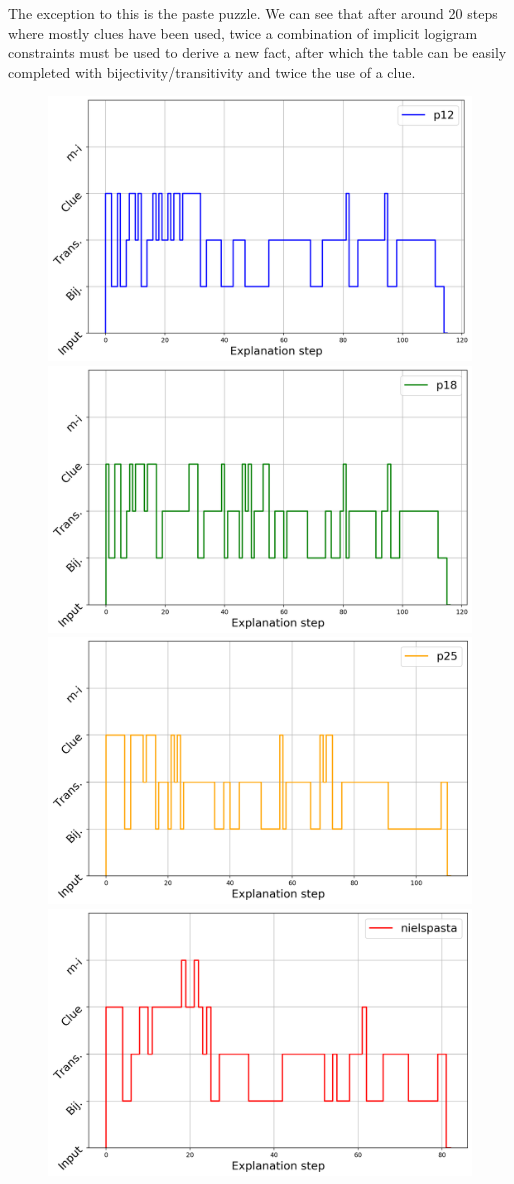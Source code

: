 The exception to this is the paste puzzle. We can see that after around 20 steps where mostly clues have been used, twice a combination of implicit logigram constraints must be used to derive a new fact, after which the table can be easily completed with bijectivity/transitivity and twice the use of a clue.

\begin{figure}
\centering
\includegraphics[width=0.49\linewidth]{figures/plot_cost_steps_p12}
\includegraphics[width=0.49\linewidth]{figures/plot_cost_steps_p18}
\includegraphics[width=0.49\linewidth]{figures/plot_cost_steps_p25}
\includegraphics[width=0.49\linewidth]{figures/plot_cost_steps_nielspasta}
\caption{}
\label{fig:steps}
\end{figure}



